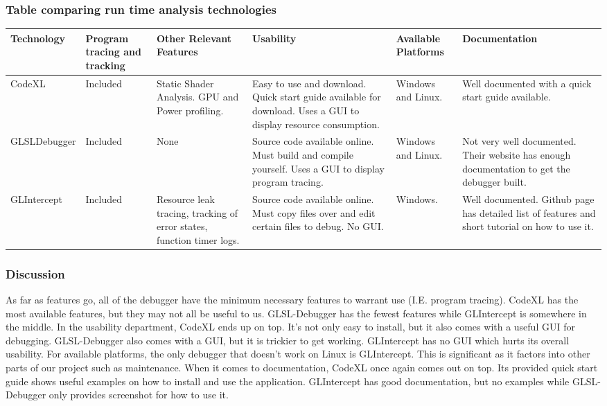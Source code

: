 \documentclass[10pt,journal,compsoc,draftclsnofoot]{IEEEtran}
\begin{document}
\subsubsection{Table comparing run time analysis technologies}
\begin{tabular}{ | m{7em} | m{7em} | m{7em} | m{7em} | m{7em} | m{7em} |  } 
\hline
\textbf{Technology}  & \textbf{Program tracing and tracking} & \textbf{Other Relevant Features} & \textbf{Usability} & \textbf{Available Platforms} & \textbf{Documentation} \\ \hline
CodeXL & Included  & Static Shader Analysis. GPU and Power profiling. & Easy to use and download. Quick start guide available for download.
Uses a GUI to display resource consumption. & Windows and Linux. & Well documented with a quick start guide available.  \\ \hline
GLSL\-Debugger & Included & None & Source code available online. Must build and compile yourself. Uses a GUI to display program tracing. & Windows and Linux. & Not very well documented. Their website has enough documentation to get the debugger built.  \\ \hline
GLIntercept & Included & Resource leak tracing, tracking of error states, function timer logs. & Source code available online. Must copy files over and edit certain files to debug. No GUI. & Windows. & Well documented. Github page has detailed list of features and short tutorial on how to use it. \\ \hline
\end{tabular}

\subsubsection{Discussion}
As far as features go, all of the debugger have the minimum necessary features to warrant use (I.E. program tracing).
CodeXL has the most available features, but they may not all be useful to us.
GLSL-Debugger has the fewest features while GLIntercept is somewhere in the middle.
In the usability department, CodeXL ends up on top.
It's not only easy to install, but it also comes with a useful GUI for debugging.
GLSL-Debugger also comes with a GUI, but it is trickier to get working.
GLIntercept has no GUI which hurts its overall usability.
For available platforms, the only debugger that doesn't work on Linux is GLIntercept.
This is significant as it factors into other parts of our project such as maintenance.
When it comes to documentation, CodeXL once again comes out on top.
Its provided quick start guide shows useful examples on how to install and use the application.
GLIntercept has good documentation, but no examples while GLSL-Debugger only provides screenshot for how to use it.
\end{document}
